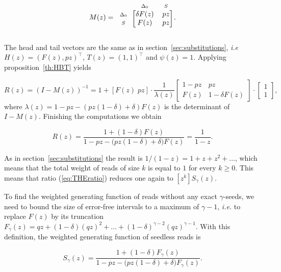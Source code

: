 \documentclass{article}
\newcommand{\smS}{\scriptstyle{S}}
\newcommand{\smDELz}{\scriptstyle{\Delta_0}}
\begin{document}
\begin{equation*}
M(z) = 
\begin{blockarray}{ccc}
       & \smDELz & \smS \\
\begin{block}{c[cc]}
\smDELz & \delta F(z) & pz \\
\smS    &        F(z) & pz \\
\end{block}
\end{blockarray}.
\end{equation*}

The head and tail vectors are the same as in
section~\ref{sec:substitutions}, \textit{i.e}
$H(z) = (F(z), pz)^\top$, $T(z) = (1,1)^\top$ and $\psi(z) = 1$.
Applying proposition~\ref{th:HBT} yields

\begin{equation*}
R(z) = (I-M(z))^{-1} =
1 + [F(z) \; pz] \cdot \frac{1}{\lambda(z)}
\begin{bmatrix}
1-pz  & pz              \\
F(z) & 1 -\delta F(z)
\end{bmatrix}
\cdot \begin{bmatrix}1 \\ 1\end{bmatrix},
\end{equation*}
where $\lambda(z) = 1-pz-(pz(1-\delta)+\delta)F(z)$ is the determinant of
$I-M(z)$. Finishing the computations we obtain

\begin{equation}
\label{eq:Rdel}
R(z) = \frac{1+(1-\delta)F(z)} {1-pz - \big(pz(1-\delta) + \delta\big)F(z)}
= \frac{1}{1-z}.
\end{equation}

As in section~\ref{sec:substitutions} the result is $1/(1-z) = 1+z +z^2 +
\ldots$, which means that the total weight of reads of size $k$ is equal
to $1$ for every $k \geq 0$. This means that ratio (\ref{eq:THEratio})
reduces one again to $[z^k]S_\gamma(z)$.

To find the weighted generating function of reads without any exact
$\gamma$-seeds, we need to bound the size of error-free intervals to a
maximum of $\gamma-1$, \textit{i.e.} to replace $F(z)$ by its truncation
$F_\gamma(z) = qz + (1-\delta)(qz)^2 + \ldots +
(1-\delta)^{\gamma-2}(qz)^{\gamma-1}$. With this definition, the weighted
generating function of seedless reads is

\begin{equation}
\label{eq:Sdel}
S_\gamma(z) = \frac{1+(1-\delta)F_\gamma(z)}
  {1-pz - \big(pz(1-\delta) + \delta\big)F_\gamma(z)}.
\end{equation}
\end{document}

